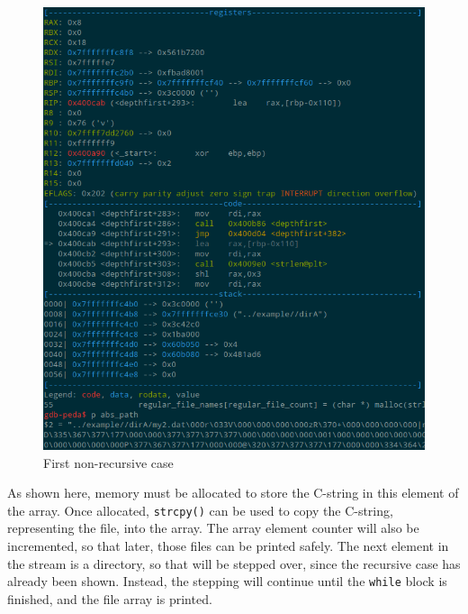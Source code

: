 \documentclass[a4paper,12pt,sffamily]{article}
\begin{document}
\begin{figure}[H]
	\centering
	\includegraphics[width=1\linewidth]{./images/10}
	\caption[first_non_recursive_case]{First non-recursive case}
	\label{fig:11}
\end{figure}
As shown here, memory must be allocated to store the C-string in this element of the array. Once
allocated, \texttt{strcpy()} can be used to copy the C-string, representing the file, into the
array. The array element counter will also be incremented, so that later, those files can be printed
safely.
The next element in the stream is a directory, so that will be stepped over, since the recursive case 
has already been shown. Instead, the stepping will continue until the \texttt{while} block is 
finished, and the file array is printed.
\end{document}
